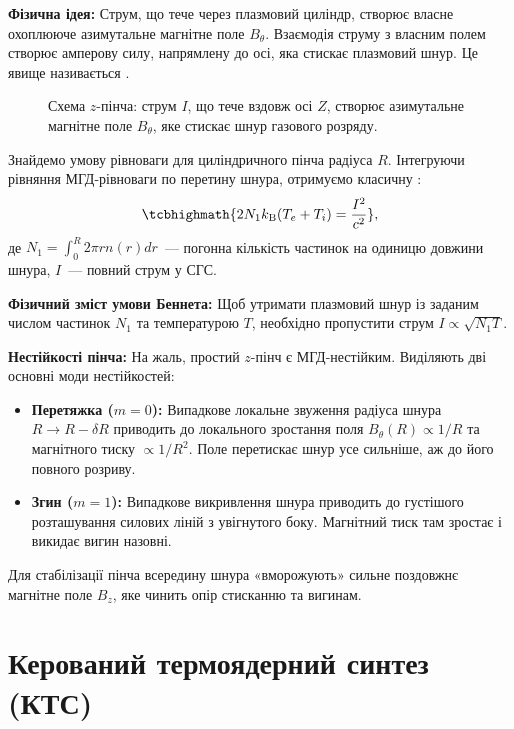 \textbf{Фізична ідея:} Струм, що тече через плазмовий циліндр, створює власне охоплююче азимутальне магнітне поле $B_\theta$. Взаємодія струму з власним полем створює амперову силу, напрямлену до осі, яка стискає плазмовий шнур. Це явище називається .

\begin{figure}[h!]\centering
	\caption{Схема $z$-пінча: струм $I$, що тече вздовж осі $Z$, створює азимутальне магнітне поле $B_\theta$, яке стискає шнур газового розряду.}\label{pic:z-pinch-equilibrium}
\end{figure}

Знайдемо умову рівноваги для циліндричного пінча радіуса $R$. Інтегруючи рівняння МГД-рівноваги по перетину шнура, отримуємо класичну :
\begin{equation}
	\tcbhighmath{2 N_1 k_{\mathrm B}(T_e + T_i) = \frac{I^2}{c^2}},
\end{equation}
де $N_1 = \int_0^R 2\pi r n(r) dr$~--- погонна кількість частинок на одиницю довжини шнура, $I$~--- повний струм у СГС.

\textbf{Фізичний зміст умови Беннета:} Щоб утримати плазмовий шнур із заданим числом частинок $N_1$ та температурою $T$, необхідно пропустити струм $I \propto \sqrt{N_1 T}$.

\textbf{Нестійкості пінча:}
На жаль, простий $z$-пінч є МГД-нестійким. Виділяють дві основні моди нестійкостей:
\begin{itemize}
	\item \textbf{Перетяжка ($m=0$):} Випадкове локальне звуження радіуса шнура $R \to R - \delta R$ приводить до локального зростання поля $B_\theta(R) \propto 1/R$ та магнітного тиску $\propto 1/R^2$. Поле перетискає шнур усе сильніше, аж до його повного розриву.
	\item \textbf{Згин ($m=1$):} Випадкове викривлення шнура приводить до густішого розташування силових ліній з увігнутого боку. Магнітний тиск там зростає і викидає вигин назовні.
\end{itemize}

Для стабілізації пінча всередину шнура «вморожують» сильне поздовжнє магнітне поле $B_z$, яке чинить опір стисканню та вигинам.

\section{Керований термоядерний синтез (КТС)}\label{sec:fusion}

